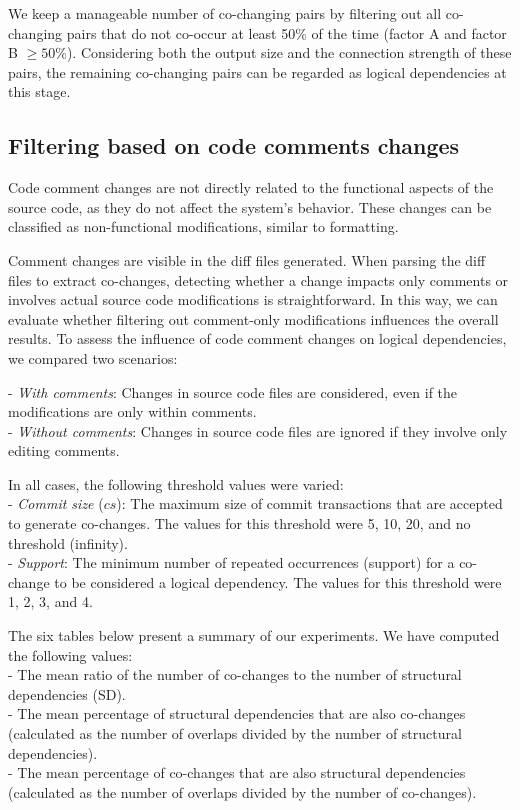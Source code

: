 We keep a manageable number of co-changing pairs by filtering out all co-changing pairs that do not co-occur at least 50\% of the time (factor A and factor B $\geq 50\%$). Considering both the output size and the connection strength of these pairs, the remaining co-changing pairs can be regarded as logical dependencies at this stage.



\subsection{Filtering based on code comments changes}
\label{subsec:filtering_comments}

\hspace{4em}Code comment changes are not directly related to the functional aspects of the source code, as they do not affect the system's behavior. These changes can be classified as non-functional modifications, similar to formatting.

Comment changes are visible in the diff files generated. When parsing the diff files to extract co-changes, detecting whether a change impacts only comments or involves actual source code modifications is straightforward. In this way, we can evaluate whether filtering out comment-only modifications influences the overall results. To assess the influence of code comment changes on logical dependencies, we compared two scenarios:

\hspace{-4em}- \textit{With comments}: Changes in source code files are considered, even if the modifications are only within comments. \\  
- \textit{Without comments}: Changes in source code files are ignored if they involve only editing comments.  

\hspace{-4em}In all cases, the following threshold values were varied: \\  
- \textit{Commit size} ($cs$): The maximum size of commit transactions that are accepted to generate co-changes. The values for this threshold were 5, 10, 20, and no threshold (infinity). \\  
- \textit{Support}: The minimum number of repeated occurrences (support) for a co-change to be considered a logical dependency. The values for this threshold were 1, 2, 3, and 4.  

\hspace{-4em}The six tables below present a summary of our experiments. We have computed the following values: \\  
- The mean ratio of the number of co-changes to the number of structural dependencies (SD). \\  
- The mean percentage of structural dependencies that are also co-changes (calculated as the number of overlaps divided by the number of structural dependencies). \\  
- The mean percentage of co-changes that are also structural dependencies (calculated as the number of overlaps divided by the number of co-changes).  



